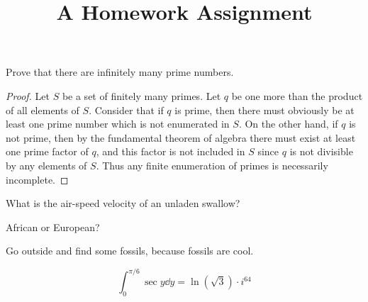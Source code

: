 \documentclass{pset}
\title{A Homework Assignment}
\begin{document}
\begin{problem}
Prove that there are infinitely many prime numbers.
\end{problem}
\begin{proof}
Let $S$ be a set of finitely many primes. Let $q$ be one more than the product of all elements of $S$. Consider that if $q$ is prime, then there must obviously be at least one prime number which is not enumerated in $S$. On the other hand, if $q$ is not prime, then by the fundamental theorem of algebra there must exist at least one prime factor of $q$, and this factor is not included in $S$ since $q$ is not divisible by any elements of $S$. Thus any finite enumeration of primes is necessarily incomplete.
\end{proof}

\begin{problem}
What is the air-speed velocity of an unladen swallow?
\end{problem}
\begin{solution}
African or European?
\end{solution}

\begin{exercise}
Go outside and find some fossils, because fossils are cool.
\end{exercise}

\begin{solution}
\[ \int_0^{\pi/6} \sec y \dd{y} = \ln(\sqrt{3}) \cdot i^{64} \]

\end{solution}
\end{document}
